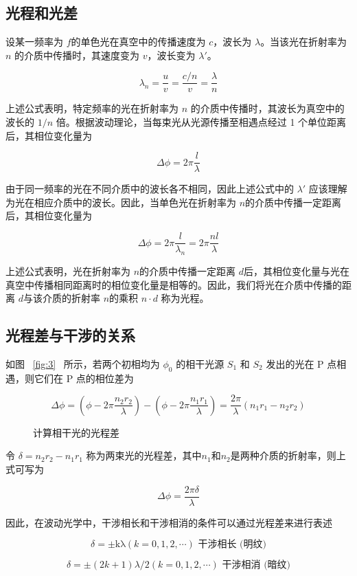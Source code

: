 \documentclass[withoutpreface,bwprint]{cumcmthesis} %
\begin{document}
\begin{appendices}
    \subsection{光程和光差}
    设某一频率为 $f$的单色光在真空中的传播速度为 $c$，波长为 $\lambda$。当该光在折射率为 $n$ 的介质中传播时，其速度变为 $v$，波长变为 $\lambda'$。

    \[\lambda_{n} = \frac{u}{v} = \frac{c/n}{v} = \frac{\lambda}{n}\]

    上述公式表明，特定频率的光在折射率为 $n$ 的介质中传播时，其波长为真空中的波长的 $1/n$ 倍。根据波动理论，当每束光从光源传播至相遇点经过 1 个单位距离后，其相位变化量为


    \[\Delta\phi = 2\pi\frac{l}{\lambda}\]

    由于同一频率的光在不同介质中的波长各不相同，因此上述公式中的 $\lambda'$ 应该理解为光在相应介质中的波长。因此，当单色光在折射率为 $n$的介质中传播一定距离后，其相位变化量为

    \[\Delta\phi = 2\pi\frac{l}{\lambda_{n}} = 2\pi\frac{nl}{\lambda}\]


    上述公式表明，光在折射率为 $n$的介质中传播一定距离 $d$后，其相位变化量与光在真空中传播相同距离时的相位变化量是相等的。因此，我们将光在介质中传播的距离 $d$与该介质的折射率 $n$的乘积 $n\cdot d$ 称为光程。


    \subsection{光程差与干涉的关系}

    如图 ~\eqref{fig:3}~ 所示，若两个初相均为 $\phi_0$ 的相干光源 $S_1$ 和 $S_2$ 发出的光在 P 点相遇，则它们在 P 点的相位差为

    \[\Delta\phi = \left( \phi - 2\pi\frac{n_{2}r_{2}}{\lambda} \right) - \left( \phi - 2\pi\frac{n_{1}r_{1}}{\lambda} \right) = \frac{2\pi}{\lambda}\left( n_{1}r_{1} - n_{2}r_{2} \right)\]

    \begin{figure}[ht]
        \centering
        \fbox{\rule{2cm}{0pt} \rule{0pt}{2cm}} %
        \caption{计算相干光的光程差}
        \label{fig:3}
    \end{figure}
    令 $\delta = n_2 r_2 - n_1 r_1$ 称为两束光的光程差，其中$n_1$和$n_2$是两种介质的折射率，则上式可写为


    \[\Delta\phi = \frac{2 \pi\delta }{\lambda}\]


    因此，在波动光学中，干涉相长和干涉相消的条件可以通过光程差来进行表述

    \[\delta = \pm \text{kλ}(k = 0,1,2,\cdots)\text{~}\text{干涉相长}\text{\ (}\text{明纹}\text{)}\]

    \[\delta = \pm (2k + 1)\lambda/2(k = 0,1,2,\cdots)\text{~}\text{干涉相消}\text{\ (}\text{暗纹}\text{)}\]


\end{appendices}
\end{document}
